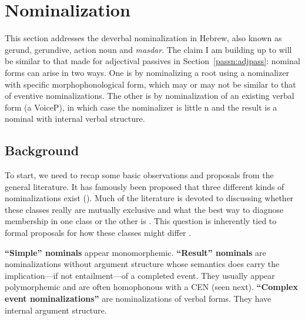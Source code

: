 \section{Nominalization} \label{passn:n}
This section addresses the deverbal nominalization in Hebrew, also known as gerund, gerundive, action noun and \emph{masdar}. The claim I am building up to will be similar to that made for adjectival passives in Section~\ref{passn:adjpass}: nominal forms can arise in two ways. One is by nominalizing a root using a nominalizer with specific morphophonological form, which may or may not be similar to that of eventive nominalizations. The other is by nominalization of an existing verbal form (a VoiceP), in which case the nominalizer is little n and the result is a nominal with internal verbal structure.

	\subsection{Background}
To start, we need to recap some basic observations and proposals from the general literature. It has famously been proposed \citep{grimshaw90} that three different kinds of nominalizations exist (\nextx). Much of the literature is devoted to discussing whether these classes really are mutually exclusive and what the best way to diagnose membership in one class or the other is \citep{alexiadou01,alexiadou09,alexiadou10b,alexiadou17,borer13oup,borer14lingua}. This question is inherently tied to formal proposals for how these classes might differ \citep{chomsky70,marantz97,harley09n,bruening13,wood19lsa}.

\pex
	\a \textbf{``Simple'' nominals} appear monomorphemic.
	\a \textbf{``Result'' nominals} are nominalizations without argument structure whose semantics does carry the implication---if not entailment---of a completed event. They usually appear polymorphemic and are often homophonous with a CEN (seen next).
	\a \textbf{``Complex event nominalizations''} are nominalizations of verbal forms. They have internal argument structure.
\xe

